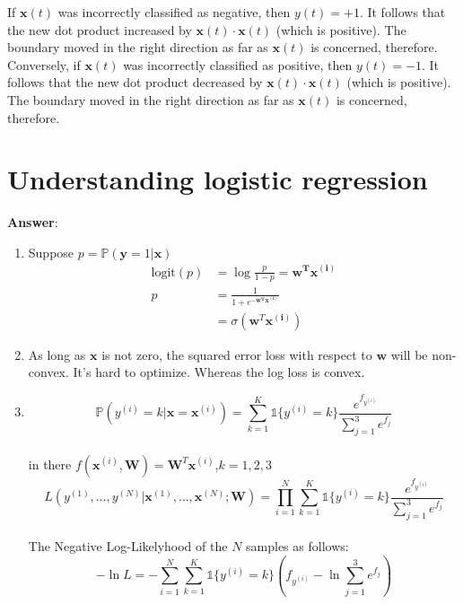 \documentclass{article}
\begin{document}
\begin{enumerate}[(1)]
If $\bm{x}(t)$ was incorrectly classified as negative, then $y(t) = +1$. It follows that the new dot product increased by $\bm{x}(t)\cdot \bm{x}(t)$ (which is positive). The boundary moved in the right direction as far as $\bm{x}(t)$ is concerned, therefore.\\
Conversely, if $\bm{x}(t)$ was incorrectly classified as positive, then $y(t) = -1$. It follows that the new dot product decreased by $\bm{x}(t)\cdot \bm{x}(t)$ (which is positive). The boundary moved in the right direction as far as $\bm{x}(t)$ is concerned, therefore.
\end{enumerate}



\section{Understanding logistic regression}


\textbf{Answer}: 
\begin{enumerate}[(1)]
	\item Suppose $p = \mathbb{P}(\bm{y}=1|\bm{x})$\\
	\begin{equation}
	\begin{aligned}
	 \text{logit}(p) &= \log \frac{p}{1-p} = \bm{w^T}\bm{x^{(i)}}\\
	 p &= \frac{1}{1+e^{-\bm{w^T}\bm{x^{(i)}}}}\\
	 &=\sigma(\bm{w}^T\bm{x^{(i)}})
	\end{aligned}
	\end{equation}
	\item As long as $\bm{x}$ is not zero, the squared error loss with respect to $\bm{w}$ will be non-convex. It's hard to optimize. Whereas the log loss is convex.

	\item $$\mathbb{P}(y^{(i)}=k|\bm{x}=\bm{x}^{(i)}) = {\displaystyle \sum_{k=1}^{K}}\mathds{1}\{y^{(i)}=k\}\frac{e^{f_{y^{(i)}}}}{\sum_{j=1}^{3}e^{f_j}}$$\\
	in there $f(\bm{x}^{(i)}, \bm{W})=\bm{W}^T\bm{x}^{(i)}$,$k=1,2,3$\\
	$$L(y^{(1)},\dots,y^{(N)}|\bm{x}^{(1)},\dots, \bm{x}^{(N)};\bm{W}) = {\displaystyle \prod_{i=1}^{N}}{\displaystyle \sum_{k=1}^{K}}\mathds{1}\{y^{(i)}=k\}\frac{e^{f_{y^{(i)}}}}{\sum_{j=1}^{3}e^{f_j}}$$\\
	The Negative Log-Likelyhood of the $N$ samples as follows:\\
	$$-\ln{L} = -\sum_{i=1}^{N}{\displaystyle \sum_{k=1}^{K}}\mathds{1}\{y^{(i)}=k\}(f_{y^{(i)}}-\ln{\sum_{j=1}^{3}e^{f_j}})$$
\end{enumerate}
\end{document}

